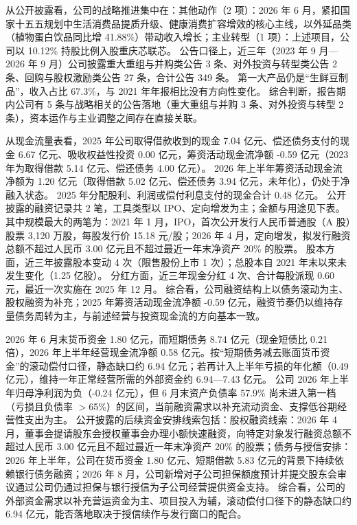  从公开披露看，公司的战略推进集中在：其他动作（2 项）：2026 年 6 月，紧扣国家十五五规划中生活消费品提质升级、健康消费扩容增效的核心主线，以外延品类（植物蛋白饮品同比增 41.88\%）带动收入增长；主业转型（1 项）：上述项目，公司以 10.12\% 持股比例入股重庆芯联芯。 公告口径上，近三年（2023 年 9 月---2026 年 9 月）公司披露重大重组与并购类公告 3 条、对外投资与转型类公告 2 条、回购与股权激励类公告 27 条，合计公告 349 条。 第一大产品仍是“生鲜豆制品”，收入占比 67.3\%，与 2021 年年报相比没有方向性变化。 综合判断，报告期内公司有 5 条与战略相关的公告落地（重大重组与并购 3 条、对外投资与转型 2 条），资本运作与主业调整之间存在直接关联。

 从现金流量表看，2025 年公司取得借款收到的现金 7.04 亿元、偿还债务支付的现金 6.67 亿元、吸收权益性投资 0.00 亿元，筹资活动现金流净额 -0.59 亿元（2023 年为取得借款 5.14 亿元、偿还债务 4.00 亿元）。 2026 年上半年筹资活动现金流净额为 1.20 亿元（取得借款 5.02 亿元、偿还债务 3.94 亿元，未年化），仍处于净融入状态。 2025 年分配股利、利润或偿付利息支付的现金合计 0.48 亿元。 公开披露的融资记录共 2 笔，工具类型以 IPO、定向增发为主；金额与用途见下表。 其中规模最大的两笔为：2021 年 1 月，IPO，首次公开发行人民币普通股（A 股）股票 3,120 万股，每股发行价 15.18 元/股；2026 年 4 月，定向增发，拟发行融资总额不超过人民币 3.00 亿元且不超过最近一年末净资产 20\% 的股票。 股本方面，近三年披露股本变动 4 次（限售股份上市 1 次）；总股本自 2021 年末以来未发生变化（1.25 亿股）。 分红方面，近三年现金分红 4 次、合计每股派现 0.60 元，最近一次实施在 2025 年 12 月。 综合看，公司融资结构上以债务滚动为主、股权融资为补充；2025 年筹资活动现金流净额 -0.59 亿元，融资节奏仍以维持存量债务周转为主，与前述经营与投资现金流的方向基本一致。

 2026 年 6 月末货币资金 1.80 亿元，而短期债务 8.74 亿元（现金短债比 0.21 倍），2026 年上半年经营现金流净额 0.58 亿元。按“短期债务减去账面货币资金”的滚动偿付口径，静态缺口约 6.94 亿元；若再计入上半年亏损的年化额（0.49 亿元），维持一年正常经营所需的外部资金约 6.94---7.43 亿元。 公司 2026 年上半年归母净利润为负（-0.24 亿元），但 6 月末资产负债率 57.9\% 尚未进入第一档（亏损且负债率 $>$65\%）的区间，当前融资需求以补充流动资金、支撑低谷期经营性支出为主。 公开披露的后续资金安排线索包括：股权融资线索：2026 年 4 月，董事会提请股东会授权董事会办理小额快速融资，向特定对象发行融资总额不超过人民币 3.00 亿元且不超过最近一年末净资产 20\% 的股票；债务与授信安排：2026 年上半年，公司在货币资金 1.80 亿元、短期借款 5.83 亿元的背景下持续依赖银行债务融资；2026 年 8 月，公司新增对子公司担保额度预计并提交股东会审议通过公司仍通过担保与银行授信为子公司经营提供资金支持。 综合看，公司的外部资金需求以补充营运资金为主、项目投入为辅，滚动偿付口径下的静态缺口约 6.94 亿元，能否落地取决于授信续作与发行窗口的配合。




